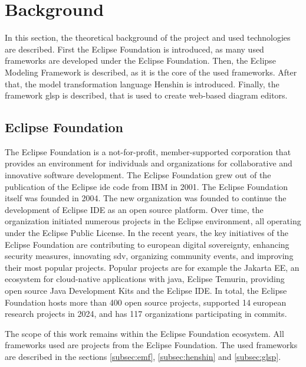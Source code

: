 \section{Background}
\label{sec:background}
  In this section, the theoretical background of the project and used technologies are described. First the Eclipse Foundation is introduced, as many used frameworks are developed under the Eclipse Foundation. Then, the Eclipse Modeling Framework is described, as it is the core of the used frameworks. After that, the model transformation language Henshin is introduced. Finally, the framework \ac{glsp} is described, that is used to create web-based diagram editors.

  \subsection{Eclipse Foundation}
  \label{subsec:eclipse-foundation}
  The Eclipse Foundation is a not-for-profit, member-supported corporation that provides an environment for individuals and organizations for collaborative and innovative software development. \cite{eclipse-review} The Eclipse Foundation grew out of the publication of the Eclipse \ac{ide} code from IBM in 2001. The Eclipse Foundation itself was founded in 2004. The new organization was founded to continue the development of Eclipse IDE as an open source platform. Over time, the organization initiated numerous projects in the Eclipse environment, all operating under the Eclipse Public License. \cite{heise-eclipse-foundation,eclipse-review} In the recent years, the key initiatives of the Eclipse Foundation are contributing to european digital sovereignty, enhancing security measures, innovating \ac{sdv}, organizing community events, and improving their most popular projects. Popular projects are for example the Jakarta EE, an ecosystem for cloud-native applications with java, Eclipse Temurin, providing open source Java Development Kits and the Eclipse IDE. \cite{eclipse-report} In total, the Eclipse Foundation hosts more than 400 open source projects, supported 14 european research projects in 2024, and has 117 organizations participating in commits. \cite{eclipse-report}

  The scope of this work remains within the Eclipse Foundation ecosystem. All frameworks used are projects from the Eclipse Foundation. The used frameworks are described in the sections \ref{subsec:emf}, \ref{subsec:henshin} and \ref{subsec:glsp}.

